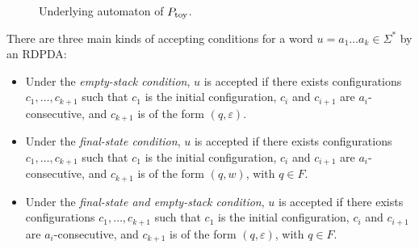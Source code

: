 \begin{figure}[h!]
\centering
{}
\caption{Underlying automaton of $P_{\rm toy}$.\label{figUnder}}
\end{figure}
There are three main kinds of accepting
conditions for a word $u=a_1\ldots a_k\in\Sigma^*$ by an RDPDA:
\begin{itemize}
\item Under the {\it empty-stack
 condition},  $u$ is accepted if there exists 
configurations $c_1,\ldots,c_{k+1}$ such that $c_1$ is the initial
configuration, $c_i$ and $c_{i+1}$ are $a_i$-consecutive, and $c_{k+1}$ is
of the form $(q,\varepsilon)$. 
\item Under the {\it final-state
 condition}, $u$ is accepted  if there exists 
configurations $c_1,\ldots,c_{k+1}$ such that $c_1$ is the initial
configuration, $c_i$ and $c_{i+1}$ are $a_i$-consecutive, and $c_{k+1}$ is
of the form $(q,w)$, with $q\in F$.
 \item Under the {\it final-state and empty-stack
 condition}, $u$ is accepted  if there exists 
configurations $c_1,\ldots,c_{k+1}$ such that $c_1$ is the initial
configuration, $c_i$ and $c_{i+1}$ are $a_i$-consecutive, and $c_{k+1}$ is
of the form $(q,\varepsilon)$, with $q\in F$.
 \end{itemize}

